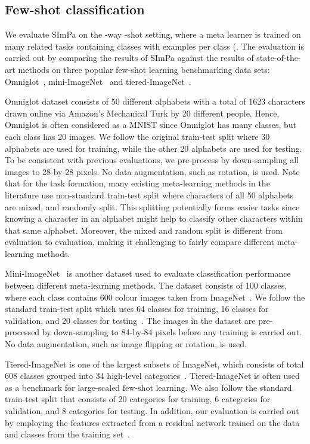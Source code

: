     \subsection{Few-shot classification}
    \label{sec:classification}
        We evaluate SImPa on the -way -shot setting, where a meta learner is trained on many related tasks containing  classes with  examples per class (. The evaluation is carried out by comparing the results of SImPa against the results of state-of-the-art methods on three popular few-shot learning benchmarking data sets: Omniglot~\cite{lake2015human}, mini-ImageNet~\cite{vinyals2016matching,ravi2017optimization} and tiered-ImageNet~\cite{ren2018meta}.
	    
	    Omniglot dataset consists of 50 different alphabets with a total of 1623 characters drawn online via Amazon's Mechanical Turk by 20 different people. Hence, Omniglot is often considered as a  MNIST since Omniglot has many classes, but each class has 20 images. We follow the original train-test split where 30 alphabets are used for training, while the other 20 alphabets are used for testing. To be consistent with previous evaluations, we pre-process by down-sampling all images to 28-by-28 pixels. No data augmentation, such as rotation, is used. Note that for the task formation, many existing meta-learning methods in the literature use non-standard train-test split where characters of all 50 alphabets are mixed, and randomly split. This splitting potentially forms easier tasks since knowing a character in an alphabet might help to classify other characters within that same alphabet. Moreover, the mixed and random split is different from evaluation to evaluation, making it challenging to fairly compare different meta-learning methods.
        
        Mini-ImageNet~\cite{vinyals2016matching} is another dataset used to evaluate classification performance between different meta-learning methods. The dataset consists of 100 classes, where each class contains 600 colour images taken from ImageNet~\cite{ILSVRC15}. We follow the standard train-test split which uses 64 classes for training, 16 classes for validation, and 20 classes for testing~\cite{ravi2017optimization}. The images in the dataset are pre-processed by down-sampling to 84-by-84 pixels before any training is carried out. No data augmentation, such as image flipping or rotation, is used.
        
        Tiered-ImageNet is one of the largest subsets of ImageNet, which consists of total 608 classes grouped into 34 high-level categories~\cite{ren2018meta}. Tiered-ImageNet is often used as a benchmark for large-scaled few-shot learning. We also follow the standard train-test split that consists of 20 categories for training, 6 categories for validation, and 8 categories for testing. In addition, our evaluation is carried out by employing the features extracted from a residual network trained on the data and classes from the training set~\cite{rusu2019meta}.

